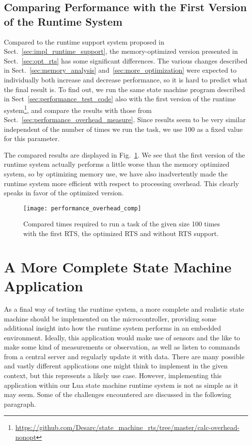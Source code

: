 \subsection{Comparing Performance with the First Version of the Runtime System}
\label{sec:comp_performance_overhead}
Compared to the runtime support system proposed in Sect.~\ref{sec:impl_runtime_support}, the memory-optimized version presented in Sect.~\ref{sec:opt_rts} has some significant differences. The various changes described in Sect.~\ref{sec:memory_analysis} and~\ref{sec:more_optimization} were expected to individually both increase and decrease performance, so it is hard to predict what the final result is. To find out, we run the same state machine program described in Sect~\ref{sec:performance_test_code} also with the first version of the runtime system\footnote{\url{https://github.com/Desarc/state_machine_rts/tree/master/calc-overhead-nonopt}}, and compare the results with those from Sect.~\ref{sec:performance_overhead_measure}. Since results seem to be very similar independent of the number of times we run the task, we use 100 as a fixed value for this parameter.

The compared results are displayed in Fig.~\ref{fig:performance_overhead_comp}. We see that the first version of the runtime system actually performs a little worse than the memory optimized system, so by optimizing memory use, we have also inadvertently made the runtime system more efficient with respect to processing overhead. This clearly speaks in favor of the optimized version.

\begin{figure}[htp]
	\centering
	\texttt{[image: performance\_overhead\_comp]}
	\caption[Results of performance comparison with the first version of the RTS]{Compared times required to run a task of the given size 100 times with the first RTS, the optimized RTS and without RTS support.}
	\label{fig:performance_overhead_comp}
\end{figure}

\FloatBarrier
\section{A More Complete State Machine Application}
\label{sec:complete_app}
As a final way of testing the runtime system, a more complete and realistic state machine should be implemented on the microcontroller, providing some additional insight into how the runtime system performs in an embedded environment. Ideally, this application would make use of sensors and the like to make some kind of measurements or observation, as well as listen to commands from a central server and regularly update it with data. There are many possible and vastly different applications one might think to implement in the given context, but this represents a likely use case. However, implementing this application within our Lua state machine runtime system is not as simple as it may seem. Some of the challenges encountered are discussed in the following paragraph.

